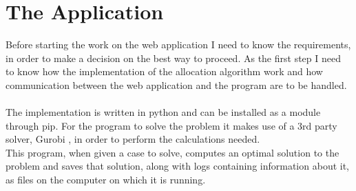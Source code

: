 \section{The Application}\label{algo}
Before starting the work on the web application I need to know the requirements, in order to make a decision on the best way to proceed. As the first step I need to know how the implementation of the allocation algorithm \cite{Chiarandini2019} work and how communication between the web application and the program are to be handled.\\\\
The implementation is written in python and can be installed as a module through pip. For the program to solve the problem it makes use of a 3rd party solver, Gurobi \cite{adsig_mod_readme}, in order to perform the calculations needed.\\This program, when given a case to solve, computes an optimal solution to the problem and saves that solution, along with logs containing information about it, as files on the computer on which it is running.

